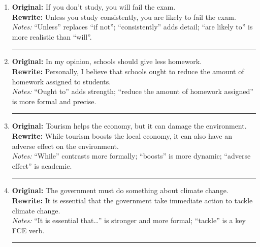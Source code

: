 \begin{enumerate}[leftmargin=2em, label=\arabic*.]
    \vspace{2ex}
    \hrule
    \vspace{2ex}

    \item \textbf{Original:} If you don’t study, you will fail the exam. \\
    \textbf{Rewrite:} Unless you study consistently, you are likely to fail the exam. \\
    \textit{Notes:} “Unless” replaces “if not”; “consistently” adds detail; “are likely to” is more realistic than “will”.

    \vspace{2ex}
    \hrule
    \vspace{2ex}

    \item \textbf{Original:} In my opinion, schools should give less homework. \\
    \textbf{Rewrite:} Personally, I believe that schools ought to reduce the amount of homework assigned to students. \\
    \textit{Notes:} “Ought to” adds strength; “reduce the amount of homework assigned” is more formal and precise.

    \vspace{2ex}
    \hrule
    \vspace{2ex}

    \item \textbf{Original:} Tourism helps the economy, but it can damage the environment. \\
    \textbf{Rewrite:} While tourism boosts the local economy, it can also have an adverse effect on the environment. \\
    \textit{Notes:} “While” contrasts more formally; “boosts” is more dynamic; “adverse effect” is academic.

    \vspace{2ex}
    \hrule
    \vspace{2ex}

    \item \textbf{Original:} The government must do something about climate change. \\
    \textbf{Rewrite:} It is essential that the government take immediate action to tackle climate change. \\
    \textit{Notes:} “It is essential that…” is stronger and more formal; “tackle” is a key FCE verb.

    \vspace{2ex}
    \hrule
    \vspace{2ex}


\end{enumerate}
